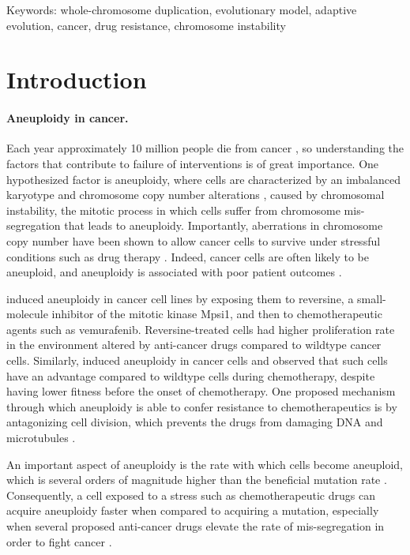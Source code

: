 \documentclass[12pt]{extarticle}
\begin{document}
Keywords: whole-chromosome duplication, evolutionary model, adaptive evolution, cancer, drug resistance, chromosome instability

\newpage
\section*{Introduction}


\paragraph{Aneuploidy in cancer.}  Each year approximately 10 million people die from cancer \citep{kocarnik2022cancer}, so understanding the factors that contribute to failure of interventions is of great importance. One hypothesized factor is aneuploidy, where cells are characterized by an imbalanced karyotype and chromosome copy number alterations \citep{schukken2018cin}, caused by chromosomal instability, the mitotic process in which cells suffer from chromosome mis-segregation that leads to aneuploidy. Importantly, aberrations in chromosome copy number have been shown to allow cancer cells to survive under stressful conditions such as drug therapy \citep{lukow2021chromosomal,rutledge2016selective}. Indeed, cancer cells are often likely to be aneuploid, and aneuploidy is associated with poor patient outcomes \citep{ben2020context,smith2018systematic}. 

 \citet{ippolito2021gene} induced aneuploidy in cancer cell lines by exposing them to reversine, a small-molecule inhibitor of the mitotic kinase Mpsi1, and then to chemotherapeutic agents such as vemurafenib. Reversine-treated cells had higher proliferation rate in the environment altered by anti-cancer drugs compared to wildtype cancer cells.
 Similarly, \citet{lukow2021chromosomal} induced aneuploidy in cancer cells and observed that such cells have an advantage compared to wildtype cells during chemotherapy, despite having lower fitness before the onset of chemotherapy.
One proposed mechanism through which aneuploidy is able to confer resistance to chemotherapeutics is by antagonizing cell division, which prevents the drugs from damaging DNA and microtubules \citep{replogle2020aneuploidy}.
 
An important aspect of aneuploidy is the rate with which cells become aneuploid, which is several orders of magnitude higher than the beneficial mutation rate \citep{bakker2023predicting}. Consequently, a cell exposed to a stress such as chemotherapeutic drugs can acquire aneuploidy faster when compared to acquiring a mutation, especially when several proposed anti-cancer drugs elevate the rate of mis-segregation in order to fight cancer \citep{lee2016effects}.
\end{document}
